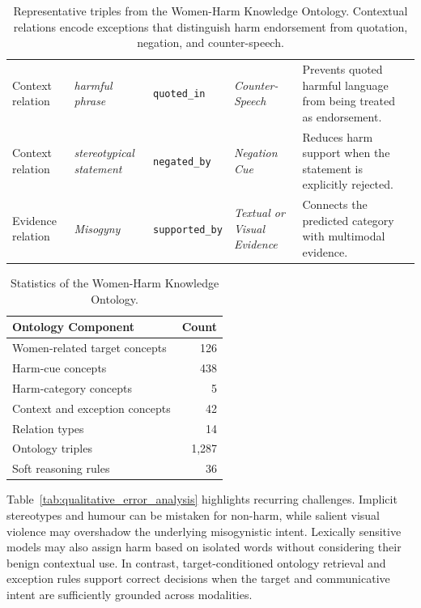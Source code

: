 \documentclass[11pt]{article}
\begin{document}
\begin{table}[t]
\begin{tabular}{p{2.1cm}p{2.8cm}p{3.2cm}p{3.0cm}p{3.3cm}}
Context relation
& \textit{harmful phrase}
& \texttt{quoted\_in}
& \textit{Counter-Speech}
& Prevents quoted harmful language from being treated as endorsement. \\

Context relation
& \textit{stereotypical statement}
& \texttt{negated\_by}
& \textit{Negation Cue}
& Reduces harm support when the statement is explicitly rejected. \\

Evidence relation
& \textit{Misogyny}
& \texttt{supported\_by}
& \textit{Textual or Visual Evidence}
& Connects the predicted category with multimodal evidence. \\

\bottomrule
\end{tabular}
\caption{Representative triples from the Women-Harm Knowledge
Ontology. Contextual relations encode exceptions that distinguish
harm endorsement from quotation, negation, and counter-speech.}
\label{tab:ontology-triples}
\end{table}

\begin{table}[t]
\centering
\small
\setlength{\tabcolsep}{5pt}
\renewcommand{\arraystretch}{1.05}
\begin{tabular}{lr}
\toprule
\textbf{Ontology Component} & \textbf{Count} \\
\midrule
Women-related target concepts & 126 \\
Harm-cue concepts & 438 \\
Harm-category concepts & 5 \\
Context and exception concepts & 42 \\
Relation types & 14 \\
Ontology triples & 1,287 \\
Soft reasoning rules & 36 \\
\bottomrule
\end{tabular}
\caption{Statistics of the Women-Harm Knowledge Ontology.}
\label{tab:ontology-statistics}
\end{table}
Table~\ref{tab:qualitative_error_analysis} highlights recurring
challenges. Implicit stereotypes and humour can be mistaken for
non-harm, while salient visual violence may overshadow the underlying
misogynistic intent. Lexically sensitive models may also assign harm
based on isolated words without considering their benign contextual
use. In contrast, target-conditioned ontology retrieval and exception
rules support correct decisions when the target and communicative
intent are sufficiently grounded across modalities.
\end{document}
